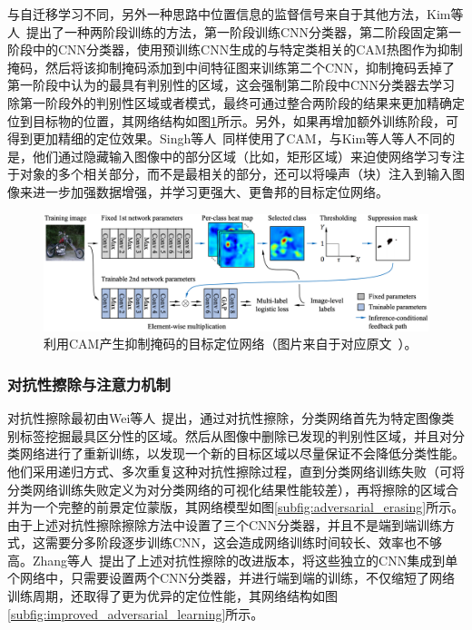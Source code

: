 与自迁移学习不同，另外一种思路中位置信息的监督信号来自于其他方法，Kim等人~\cite{Kim_2017_ICCV}提出了一种两阶段训练的方法，第一阶段训练CNN分类器，第二阶段固定第一阶段中的CNN分类器，使用预训练CNN生成的与特定类相关的CAM热图作为抑制掩码，然后将该抑制掩码添加到中间特征图来训练第二个CNN，抑制掩码丢掉了第一阶段中认为的最具有判别性的区域，这会强制第二阶段中CNN分类器去学习除第一阶段外的判别性区域或者模式，最终可通过整合两阶段的结果来更加精确定位到目标物的位置，其网络结构如图\ref{fig:cam_based_weakly_supervised_localization}所示。另外，如果再增加额外训练阶段，可得到更加精细的定位效果。Singh等人~\cite{Krishna2018}同样使用了CAM，与Kim等人等人不同的是，他们通过隐藏输入图像中的部分区域（比如，矩形区域）来迫使网络学习专注于对象的多个相关部分，而不是最相关的部分，还可以将噪声（块）注入到输入图像来进一步加强数据增强，并学习更强大、更鲁邦的目标定位网络。

\begin{figure}[h]
	\centering
	\includegraphics[width=1.0\textwidth]{figure/cam_based_weakly_supervised_localization}
	\caption[利用CAM产生抑制掩码的目标定位网络]{利用CAM产生抑制掩码的目标定位网络（图片来自于对应原文~\cite{Krishna2018}）。}
	\label{fig:cam_based_weakly_supervised_localization}
\end{figure}

\subsubsection*{对抗性擦除与注意力机制}
对抗性擦除最初由Wei等人~\cite{WeiFLCZY17}提出，通过对抗性擦除，分类网络首先为特定图像类别标签挖掘最具区分性的区域。然后从图像中删除已发现的判别性区域，并且对分类网络进行了重新训练，以发现一个新的目标区域以尽量保证不会降低分类性能。他们采用递归方式、多次重复这种对抗性擦除过程，直到分类网络训练失败（可将分类网络训练失败定义为对分类网络的可视化结果性能较差），再将擦除的区域合并为一个完整的前景定位蒙版，其网络模型如图\ref{subfig:adversarial_erasing}所示。由于上述对抗性擦除擦除方法中设置了三个CNN分类器，并且不是端到端训练方式，这需要分多阶段逐步训练CNN，这会造成网络训练时间较长、效率也不够高。Zhang等人~\cite{ZhangWF0H18}提出了上述对抗性擦除的改进版本，将这些独立的CNN集成到单个网络中，只需要设置两个CNN分类器，并进行端到端的训练，不仅缩短了网络训练周期，还取得了更为优异的定位性能，其网络结构如图\ref{subfig:improved_adversarial_learning}所示。

